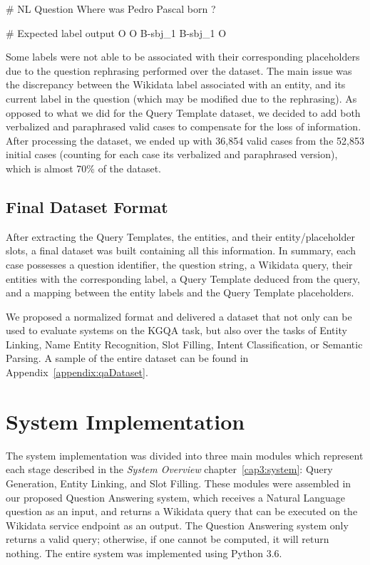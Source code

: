\begin{sparqlcode}[%
    caption={BIO label representation for a Natural Language Question.}, 
    label={lst:sequenceLabelingExampleLcquad2}]
# NL Question
Where was Pedro Pascal born ?

# Expected label output
O O B-sbj_1 B-sbj_1 O
\end{sparqlcode}

Some labels were not able to be associated with their corresponding placeholders due to the 
question rephrasing performed over the \LCQuADtwo{} dataset. The main issue was the discrepancy 
between the Wikidata label associated with an entity, and its current label in the question 
(which may be modified due to the rephrasing). As opposed to what we did for the Query Template 
dataset, we decided to add both verbalized and paraphrased valid cases to compensate 
for the loss of information. After processing the dataset, we ended up with 36,854 valid cases 
from the 52,853 initial cases (counting for each case its verbalized and paraphrased version), 
which is almost 70\% of the dataset.

\subsection{Final Dataset Format}
\label{cap4:experimentalDesign/QaDataset/finalFormat}
After extracting the Query Templates, the entities, and their entity/placeholder slots, a final 
\LCQuADtwo{} dataset was built containing all this information. In summary, each case possesses a 
question identifier, the question string, a Wikidata \SPARQL{} query, their entities with the 
corresponding label, a Query Template deduced from the \SPARQL{} query, and a mapping between the 
entity labels and the Query Template placeholders. 

We proposed a normalized format and delivered a dataset that not only can be used to evaluate 
systems on the KGQA task, but also over the tasks of Entity Linking, Name Entity Recognition, 
Slot Filling, Intent Classification, or Semantic Parsing. A sample of the entire dataset can be 
found in Appendix~\ref{appendix:qaDataset}.

\section{System Implementation}
\label{cap4:experimentalDesign/systemImplementation}
The system implementation was divided into three main modules which represent each stage 
described in the \textit{System Overview} chapter~\ref{cap3:system}: Query Generation, Entity Linking, and Slot 
Filling. These modules were assembled in our proposed Question Answering system, which receives 
a Natural Language question as an input, and returns a Wikidata \SPARQL{} query that can be executed 
on the Wikidata service endpoint as an output. The Question Answering system only returns a valid 
\SPARQL{} query; otherwise, if one cannot be computed, it will return nothing. The entire system was implemented 
using Python 3.6. 

